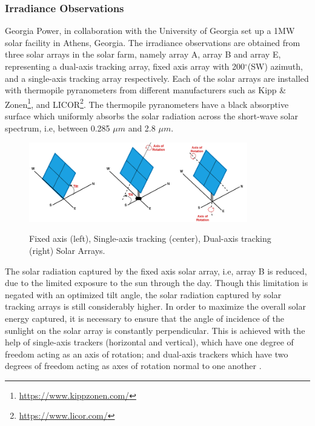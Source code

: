 \subsubsection*{Irradiance Observations}
\par Georgia Power, in collaboration with the University of Georgia set up a 1MW solar facility in Athens, Georgia. The irradiance observations are obtained from three solar arrays in the solar farm, namely array A, array B and array E, representing a dual-axis tracking array, fixed axis array with 200$^{\circ}$(SW) azimuth, and a single-axis tracking array respectively. Each of the solar arrays are installed with thermopile pyranometers from different manufacturers such as Kipp \& Zonen\footnote{\url{https://www.kippzonen.com/}}, and LICOR\footnote{\url{https://www.licor.com/}}. The thermopile pyranometers have a black absorptive surface which uniformly absorbs the solar radiation across the short-wave solar spectrum, i.e, between 0.285 $\mu m$ and 2.8 $\mu m$. 

\begin{figure}[htbp]
    \begin{center}
    	\includegraphics[width=0.85\textwidth]{chapter3/fig_pyranometers.png}
    	\label{fig:fig_pyranometers}
    	\caption[Fixed axis, Single-axis tracking, Dual-axis tracking Solar Arrays]{Fixed axis (left), Single-axis tracking (center), Dual-axis tracking (right) Solar Arrays.}
    \end{center}
\end{figure}

The solar radiation captured by the fixed axis solar array, i.e, array B is reduced, due to the limited exposure to the sun through the day. Though this limitation is negated with an optimized tilt angle, the solar radiation captured by solar tracking arrays is still considerably higher. In order to maximize the overall solar energy captured, it is necessary to ensure that the angle of incidence of the sunlight on the solar array is constantly perpendicular. This is achieved with the help of single-axis trackers (horizontal and vertical), which have one degree of freedom acting as an axis of rotation; and dual-axis trackers which have two degrees of freedom acting as axes of rotation normal to one another \cite{irradiance_solartracker}.  


